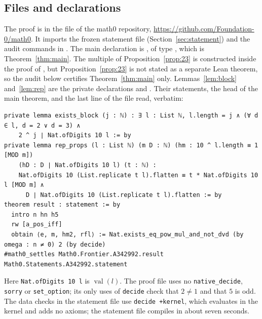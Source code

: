 \documentclass[11pt]{amsart}
\theoremstyle{plain}
\theoremstyle{definition}
\newcommand{\val}{\operatorname{val}}
\begin{document}
\subsection*{Files and declarations}
The proof is in the file  of the math0 repository, \url{https://github.com/Foundation-0/math0}. It imports the frozen statement file  (Section~\ref{sec:statement}) and the audit commands in . The main declaration is , of type , which is Theorem~\ref{thm:main}. The multiple of Proposition~\ref{prop:23} is constructed inside the proof of , but Proposition~\ref{prop:23} is not stated as a separate Lean theorem, so the audit below certifies Theorem~\ref{thm:main} only. Lemmas~\ref{lem:block} and~\ref{lem:rep} are the private declarations  and . Their statements, the head of the main theorem, and the last line of the file read, verbatim:
\begin{lstlisting}
private lemma exists_block (j : ℕ) : ∃ l : List ℕ, l.length = j ∧ (∀ d ∈ l, d = 2 ∨ d = 3) ∧
    2 ^ j ∣ Nat.ofDigits 10 l := by
private lemma rep_props (l : List ℕ) (m D : ℕ) (hm : 10 ^ l.length ≡ 1 [MOD m])
    (hD : D ∣ Nat.ofDigits 10 l) (t : ℕ) :
    Nat.ofDigits 10 (List.replicate t l).flatten ≡ t * Nat.ofDigits 10 l [MOD m] ∧
      D ∣ Nat.ofDigits 10 (List.replicate t l).flatten := by
theorem result : statement := by
  intro n hn h5
  rw [a_pos_iff]
  obtain ⟨e, m, hm2, rfl⟩ := Nat.exists_eq_pow_mul_and_not_dvd (by omega : n ≠ 0) 2 (by decide)
#math0_settles Math0.Frontier.A342992.result Math0.Statements.A342992.statement
\end{lstlisting}
Here \texttt{Nat.ofDigits 10 l} is $\val(l)$. The proof file uses no \texttt{native\_decide}, \texttt{sorry} or \texttt{set\_option}; its only uses of \texttt{decide} check that $2\ne1$ and that $5$ is odd. The data checks in the statement file use \texttt{decide +kernel}, which evaluates in the kernel and adds no axioms; the statement file compiles in about seven seconds.
\end{document}
